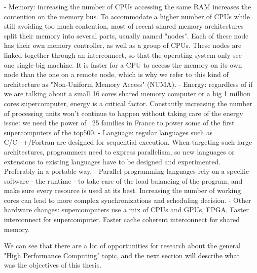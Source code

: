  - Memory: increasing the number of CPUs accessing the same RAM increases the contention on the memory bus. To accommodate a higher number of CPUs while still avoiding too much contention, most of recent shared memory architectures split their memory into several parts, usually named "nodes". Each of these node has their own memory controller, as well as a group of CPUs. These nodes are linked together through an interconnect, so that the operating system only see one single big machine.
 It is faster for a CPU to access the memory on its own node than the one on a remote node, which is why we refer to this kind of architecture as "Non-Uniform Memory Access" (NUMA).
 - Energy: regardless of if we are talking about a small 16 cores shared memory computer or a big 1 million cores supercomputer, energy is a critical factor. Constantly increasing the number of processing units won't continue to happen without taking care of the energy issue: we need the power of ~25 families in France to power some of the first supercomputers of the top500.
 - Language: regular languages such as C/C++/Fortran are designed for sequential execution. When targeting such large architectures, programmers need to express parallelism, so new languages or extensions to existing languages have to be designed and experimented. Preferably in a portable way.
 - Parallel programming languages rely on a specific software - the runtime - to take care of the load balancing of the program, and make sure every resource is used at its best. Increasing the number of working cores can lead to more complex synchronizations and scheduling decision.
 - Other hardware changes: supercomputers use a mix of CPUs and GPUs, FPGA. Faster interconnect for supercomputer. Faster cache coherent interconnect for shared memory.


We can see that there are a lot of opportunities for research about the general "High Performance Computing" topic, and the next section will describe what was the objectives of this thesis.




